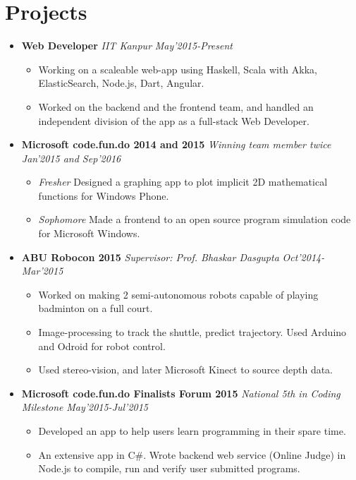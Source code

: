 \documentclass[11pt,a4paper]{moderncv}
\newcommand{\experience}[4]{
\vspace{0.1cm}
\item \textbf{\large{#1}} \emph{#2} \hfill \textit{#3}
  \begin{itemize}[leftmargin=*]
    \setlength\itemsep{0em} #4
  \end{itemize}
}
\begin{document}
\section*{Projects}
\begin{itemize}
  \setlength\itemsep{0.5em}
\experience{Web Developer}{IIT Kanpur}{May'2015-Present}{
    \item Working on a scaleable web-app using Haskell, Scala with Akka, ElasticSearch, Node.js, Dart, Angular.
    \item Worked on the backend and the frontend team, and handled an independent division of the app as a full-stack Web Developer.
    }

\experience{Microsoft code.fun.do 2014 and 2015}{Winning team member twice}{Jan'2015 and Sep'2016}{
    \item \textit{Fresher} Designed a graphing app to plot implicit 2D mathematical functions for Windows Phone.
    \item \textit{Sophomore} Made a frontend to an open source program simulation code for Microsoft Windows.
    }

\experience{ABU Robocon 2015}{Supervisor: Prof. Bhaskar Dasgupta}{Oct'2014-Mar'2015}{
    \item Worked on making 2 semi-autonomous robots capable of playing badminton on a full court.
    \item Image-processing to track the shuttle, predict trajectory. Used Arduino and Odroid for robot control.
    \item Used stereo-vision, and later Microsoft Kinect to source depth data.
    }

\experience{Microsoft code.fun.do Finalists Forum 2015}{National 5th in Coding Milestone}{May'2015-Jul'2015}{
    \item Developed an app to help users learn programming in their spare time.
    \item An extensive app in C\#. Wrote backend web service (Online Judge) in Node.js to compile, run and verify user submitted programs.
    }
    \end{itemize}
\end{document}
